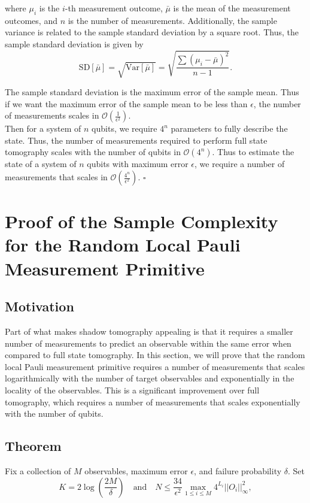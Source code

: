 \documentclass[12pt]{article}
\begin{document}
    where $\mu_i$ is the $i$-th measurement outcome, $\bar{\mu}$ is the mean of the measurement outcomes, and $n$ is the number of measurements. Additionally, the sample variance is related to the sample standard deviation by a square root. Thus, the sample standard deviation is given by
    \begin{equation}
        \text{SD}[\bar{\mu}] = \sqrt{\text{Var}[\bar{\mu}]} = \sqrt{\frac{\sum (\mu_i - \bar{\mu})^2}{n-1}}.
    \end{equation}

    The sample standard deviation is the maximum error of the sample mean. Thus if we want the maximum error of the sample mean to be less than $\epsilon$, the number of measurements scales in $\mathcal{O}\left( \frac{1}{\epsilon^2} \right)$.\\
    Then for a system of $n$ qubits, we require $4^n$ parameters to fully describe the state. Thus, the number of measurements required to perform full state tomography scales with the number of qubits in $\mathcal{O}\left( 4^n \right)$. Thus to estimate the state of a system of $n$ qubits with maximum error $\epsilon$, we require a number of measurements that scales in $\mathcal{O}\left( \frac{4^n}{\epsilon^2} \right)$.
    \hfill $\square$


    \section{Proof of the Sample Complexity for the Random Local Pauli Measurement Primitive}
    \subsection{Motivation}
    Part of what makes shadow tomography appealing is that it requires a smaller number of measurements to predict an observable within the same error when compared to full state tomography. In this section, we will prove that the random local Pauli measurement primitive requires a number of measurements that scales logarithmically with the number of target observables and exponentially in the locality of the observables. This is a significant improvement over full tomography, which requires a number of measurements that scales exponentially with the number of qubits. 

    \subsection{Theorem}
    Fix a collection of $M$ observables, maximum error $\epsilon$, and failure probability $\delta$. Set 
    \begin{equation*}
        K = 2 \log{\left(\frac{2M}{\delta}\right)} \quad \text{and} \quad N \leq \frac{34}{\epsilon^2} \max_{1 \leq i \leq M} 4^{L_i} ||O_i||^2_\infty,
    \end{equation*}
\end{document}
